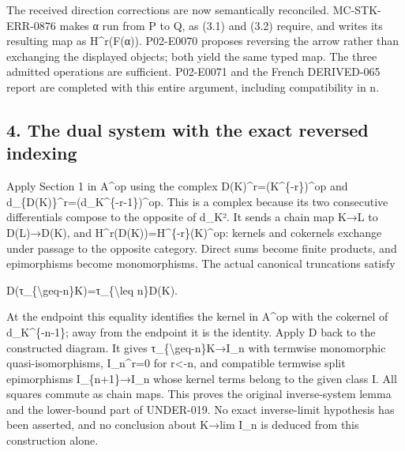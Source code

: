 The received direction corrections are now semantically reconciled. MC-STK-ERR-0876 makes α run from P to Q,\allowbreak{} as (3.1)\allowbreak{} and (3.2)\allowbreak{} require,\allowbreak{} and writes its resulting map as H\textasciicircum{}r(F(α)\allowbreak{})\allowbreak{}. P02-E0070 proposes reversing the arrow rather than exchanging the displayed objects; both yield the same typed map. The three admitted operations are sufficient. P02-E0071 and the French DERIVED-065 report are completed with this entire argument,\allowbreak{} including compatibility in n.

\subsection{4. The dual system with the exact reversed indexing}\label{proofs-9206-9744-the-dual-system-with-the-exact-reversed-indexing}

Apply Section 1 in A\^{}op using the complex D(K)\allowbreak{}\textasciicircum{}r\allowbreak{}=(K\textasciicircum{}\{-r\})\allowbreak{}\textasciicircum{}op and d\_\allowbreak{}\{D(K)\allowbreak{}\}\textasciicircum{}r\allowbreak{}=(d\_\allowbreak{}K\textasciicircum{}\{-r-1\})\allowbreak{}\textasciicircum{}op. This is a complex because its two consecutive differentials compose to the opposite of d\_\allowbreak{}K². It sends a chain map K\allowbreak{}→L to D(L)\allowbreak{}\allowbreak{}→D(K)\allowbreak{},\allowbreak{} and H\textasciicircum{}r(D(K)\allowbreak{})\allowbreak{}\allowbreak{}=H\textasciicircum{}\{-r\}(K)\allowbreak{}\textasciicircum{}op:\allowbreak{} kernels and cokernels exchange under passage to the opposite category. Direct sums become finite products,\allowbreak{} and epimorphisms become monomorphisms. The actual canonical truncations satisfy

D(τ\_\allowbreak{}\{\textbackslash{}geq-n\}K)\allowbreak{}\allowbreak{}=τ\_\allowbreak{}\{\textbackslash{}leq n\}D(K)\allowbreak{}.

At the endpoint this equality identifies the kernel in A\^{}op with the cokernel of d\_\allowbreak{}K\textasciicircum{}\{-n-1\}; away from the endpoint it is the identity. Apply D back to the constructed diagram. It gives τ\_\allowbreak{}\{\textbackslash{}geq-n\}K\allowbreak{}→I\_\allowbreak{}n with termwise monomorphic quasi-isomorphisms,\allowbreak{} I\_\allowbreak{}n\textasciicircum{}r\allowbreak{}=0 for r<-n,\allowbreak{} and compatible termwise split epimorphisms I\_\allowbreak{}\{n\allowbreak{}+1\}\allowbreak{}→I\_\allowbreak{}n whose kernel terms belong to the given class I. All squares commute as chain maps. This proves the original inverse-system lemma and the lower-bound part of UNDER-019. No exact inverse-limit hypothesis has been asserted,\allowbreak{} and no conclusion about K\allowbreak{}→lim I\_\allowbreak{}n is deduced from this construction alone.

